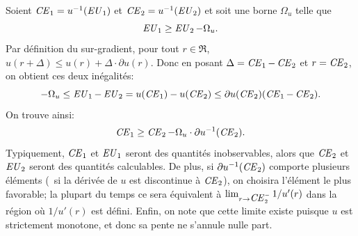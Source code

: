 \begin{lemme}
  \label{lem:ce}
  Soient $\nCE_1 = u^{-1}(\nEU_1)$ et $\nCE_2 = u^{-1}(\nEU_2)$ et soit une borne $\Omega_u$ telle
  que
  \begin{equation}
    \nEU_1 \geq \nEU_2 - \Omega_u.
  \end{equation}
  Par définition du sur-gradient, pour tout $r \in \Re$,
  $u(r+\Delta) \leq u(r) + \Delta\cdot\partial u(r)$. Donc en posant
  $\Delta = \nCE_1 - \nCE_2$ et $r=\nCE_2$, on obtient ces deux inégalités:
  \begin{equation}
    -\Omega_u \leq \nEU_1 - \nEU_2 = u(\nCE_1) - u(\nCE_2) \leq \partial u(\nCE_2)(\nCE_1 - \nCE_2).
  \end{equation}
  On trouve ainsi:
  \begin{equation}
    \nCE_1 \geq \nCE_2 - \Omega_u\cdot \partial u^{-1}(\nCE_2).
  \end{equation}
  Typiquement, $\nCE_1$ et $\nEU_1$ seront des quantités inobservables, alors que $\nCE_2$
  et $\nEU_2$ seront des quantités calculables. De plus, si $\partial u^{-1}(\nCE_2)$ comporte
  plusieurs éléments (\eg\ si la dérivée de $u$ est discontinue à $\nCE_2$), on choisira
  l'élément le plus favorable; la plupart du temps ce sera équivalent à
  $\lim_{r\to\nCE_2^{-}}1/u'(r)$ dans la région où $1/u'(r)$ est défini. Enfin, on note que
  cette limite existe puisque $u$ est strictement monotone, et donc sa pente ne s'annule
  nulle part.
\end{lemme}


